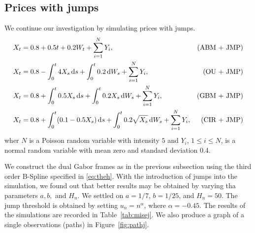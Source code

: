  \subsection{Prices with jumps}
We continue our investigation by simulating prices with jumps.    
\begin{align}
  & X_t = 0.8 +  0.5  t + 0.2  W_t + \sum_{i = 1}^N Y_i,\notag & \text{(ABM + JMP)}\\
  & X_t = 0.8 -\int_0^t 4 X_s \D s + \int^t_0 0.2 \D W_s +  \sum_{i = 1}^N Y_i ,\notag & \text{(OU + JMP)}\\
  & X_t = 0.8 + \int_0^t 0.5 X_s \D s + \int^t_0 0.2 X_s \D W_s + \sum_{i = 1}^N Y_i,\notag & \text{(GBM + JMP)}\\
  & X_t = 0.8 + \int_0^t(0.1 - 0.5 X_s) \D s +\int^t_0  0.2 \sqrt{X_s} \D W_s + \sum_{i = 1}^N Y_i,\notag & \text{(CIR + JMP)}
  \label{}
\end{align}
wher $N$ is a Poisson random variable with intensity $5$ and $Y_i$, $1 \le  i\le N$, is a normal random variable with mean zero and standard deviation 0.4.  

We construct the dual  Gabor frames as in the previous subsection using the  third order B-Spline specified in \eqref{eq:theh}. With the introduction of jumps into the simulation, we found out that better results may be obtained by varying tha parameters $a,b,$ and $H_n$. We settled on $a = 1/7$, $b = 1/25$, and $H_n = 50$. The jump threshold is obtained by setting $u_n = n^{\alpha}$, where $\alpha = -0.45$. The results of the simulations are recorded in Table~\ref{tab:misej}. We also produce a graph of a single observations (paths) in Figure~\ref{fig:pathj}. %


